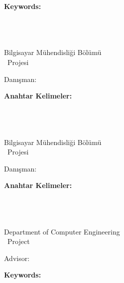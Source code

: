 \abstractTextEnglish

{\bfseries Keywords:} \abstractKeywordsEnglish


\newpage
\chapter*{\tabstract}

\begin{center}
{\bfseries \Large\titleTR}

\studenti \\ \studentii

Bilgisayar Mühendisliği Bölümü \\ {\tdegree~Projesi}

Danışman: \advisorTR

\end{center}

\abstractTextTurkish

{\bfseries Anahtar Kelimeler:} \abstractKeywordsTurkish

\else
\newpage
\chapter*{\tabstract}

\begin{center}
{\bfseries \Large\titleTR}

\studenti \\ \studentii

Bilgisayar Mühendisliği Bölümü \\ {\tdegree~Projesi}

Danışman: \advisorTR

\end{center}

\abstractTextTurkish

{\bfseries Anahtar Kelimeler:} \abstractKeywordsTurkish

\newpage
\chapter*{\eabstract}

\begin{center}
{\bfseries \Large\titleEN}

\studenti \\ \studentii

Department of Computer Engineering \\ {\degree~Project}

Advisor: \advisorEN

\end{center}

\abstractTextEnglish

{\bfseries Keywords:} \abstractKeywordsEnglish

\fi
\fi